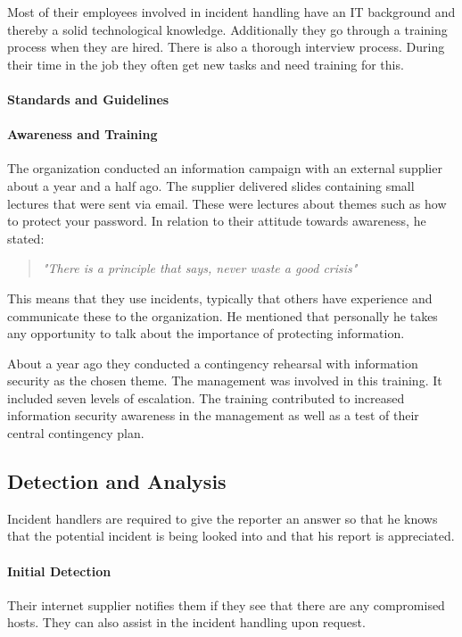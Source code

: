 Most of their employees involved in incident handling have an IT background and thereby a solid technological knowledge. Additionally they go through a training process when they are hired. There is also a thorough interview process. During their time in the job they often get new tasks and need training for this. 

\paragraph{Standards and Guidelines}

\paragraph{Awareness and Training}
The organization conducted an information campaign with an external supplier about a year and a half ago. The supplier delivered slides containing small lectures that were sent via email. These were lectures about themes such as how to protect your password. In relation to their attitude towards awareness, he stated: 

\begin{quote}
\textit{"There is a principle that says, never waste a good crisis"}
\end{quote}

This means that they use incidents, typically that others have experience and communicate these to the organization. He mentioned that personally he takes any opportunity to talk about the importance of protecting information.

About a year ago they conducted a contingency rehearsal with information security as the chosen theme. The management was involved in this training. It included seven levels of escalation. The training contributed to increased information security awareness in the management as well as a test of their central contingency plan.

\subsection{Detection and Analysis}
Incident handlers are required to give the reporter an answer so that he knows that the potential incident is being looked into and that his report is appreciated.

\paragraph{Initial Detection}
Their internet supplier notifies them if they see that there are any compromised hosts. They can also assist in the incident handling upon request.

